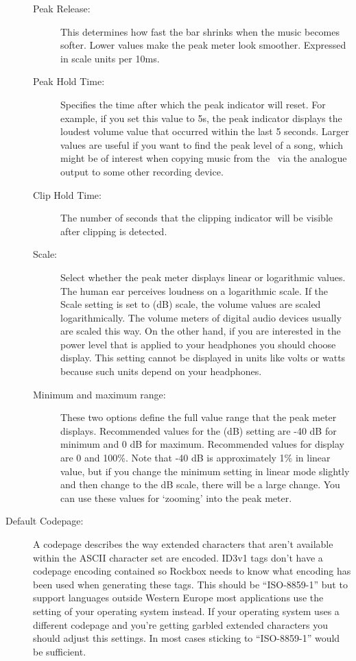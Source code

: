 \begin{description}
{      \begin{description}
      \item[Peak Release:]
        This determines how fast the bar shrinks when the music becomes
        softer. Lower values make the peak meter look smoother.
        Expressed in scale units per 10ms.
      \item[Peak Hold Time:]
        Specifies the time after which the peak indicator will reset.
        For example, if you set this value to 5s, the peak indicator displays
        the loudest volume value that occurred within the last 5 seconds.
        Larger values are useful if you want to find the peak level of a song,
        which might be of interest when copying music from the \dap\ via the
        analogue output to some other recording device.
      \item[Clip Hold Time:]
        The number of seconds that the clipping indicator will be visible
        after clipping is detected.
      \item[Scale:]
        Select whether the peak meter displays linear or logarithmic values.
        The human ear perceives loudness on a logarithmic scale. If the Scale
        setting is set to  (dB) scale, the volume values
        are scaled logarithmically. The volume meters of digital audio
        devices usually are scaled this way. On the other hand, if you
        are interested in the power level that is applied to your headphones
        you should choose  display. This setting cannot be
        displayed in units like volts or watts because such units depend
        on your headphones.
      \item[Minimum and maximum range:]
        These two options define the full value range that the peak meter
        displays. Recommended values for the  (dB) setting
        are {}-40 dB for minimum and 0 dB for maximum. Recommended values
        for  display are 0 and 100\%. Note that {}-40 dB is
        approximately 1\% in linear value, but if you change the minimum
        setting in linear mode slightly and then change to the dB scale,
        there will be a large change. You can use these values for `zooming'
        into the peak meter.
      \end{description}
    }
    \item[Default Codepage:]
      A codepage describes the way extended characters that aren't available
      within the ASCII character set are encoded. ID3v1 tags don't have a
      codepage encoding contained so Rockbox needs to know what encoding has
      been used when generating these tags. This should be ``ISO-8859-1'' but
      to support languages outside Western Europe most applications use
      the setting of your operating system instead. If your operating system
      uses a different codepage and you're getting garbled extended characters
      you should adjust this settings. In most cases sticking to
      ``ISO-8859-1'' would be sufficient.
  \end{description}
